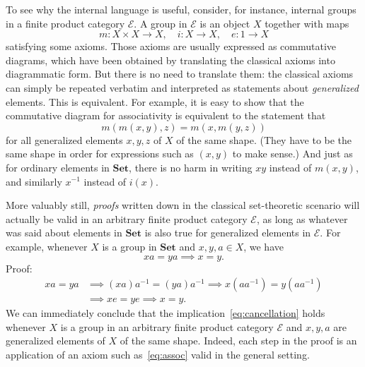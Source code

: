 \documentclass{article}
\newcommand{\cat}[1]{\mathscr{#1}}
\newcommand{\fcat}[1]{\mathbf{#1}}
\newcommand{\Set}{\fcat{Set}}
\newcommand{\E}{\cat{E}}
\newcommand{\cln}{\colon}
\begin{document}
To see why the internal language is useful, consider, for instance, internal
groups in a finite product category $\E$.  A group in $\E$ is an object $X$
together with maps
\[
m\cln X \times X \to X,
\quad
i\cln X \to X,
\quad
e\cln 1 \to X
\]
satisfying some axioms.  Those axioms are usually expressed as commutative
diagrams, which have been obtained by translating the classical axioms into
diagrammatic form.  But there is no need to translate them: the classical
axioms can simply be repeated verbatim and interpreted as statements about
\emph{generalized} elements.  This is equivalent.  For example, it is easy to
show that the commutative diagram for associativity is equivalent to the
statement that
% 
\begin{equation}        \label{eq:assoc}
m(m(x, y), z) = m(x, m(y, z))
\end{equation}
% 
for all generalized elements $x, y, z$ of $X$ of the same shape.  (They have
to be the same shape in order for expressions such as $(x, y)$ to make sense.)
And just as for ordinary elements in $\Set$, there is no harm in writing $xy$
instead of $m(x, y)$, and similarly $x^{-1}$ instead of $i(x)$.

More valuably still, \emph{proofs} written down in the classical set-theoretic
scenario will actually be valid in an arbitrary finite product category $\E$,
as long as whatever was said about elements in $\Set$ is also true for
generalized elements in $\E$.  For example, whenever $X$ is a group in $\Set$
and $x, y, a \in X$, we have
% 
\begin{equation}        \label{eq:cancellation}
xa = ya \implies x = y.
\end{equation}
% 
Proof:
% 
\begin{align*}
xa = ya &
\implies
(xa)a^{-1} = (ya)a^{-1}
\implies
x(a a^{-1}) = y(a a^{-1})       \\
&
\implies
xe = ye
\implies
x = y.
\end{align*}
% 
We can immediately conclude that the implication~\eqref{eq:cancellation} holds
whenever $X$ is a group in an arbitrary finite product category $\E$ and $x,
y, a$ are generalized elements of $X$ of the same shape.  Indeed, each step in
the proof is an application of an axiom such as~\eqref{eq:assoc} valid in the
general setting.  
\end{document}
